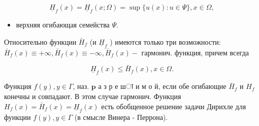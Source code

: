 \documentclass[10pt]{article}
\begin{document}
\[

\underline{H}_{f}(x)=\underline{H}_{f}(x ; \Omega)=\sup \{u(x): u \in \Psi\}, x \in \Omega,

\]



\begin{itemize}

  \item верхняя огибающая семейства $\Psi$.

\end{itemize}



Относительно функции $\bar{H}_{f}$ (и $\underline{H}_{f}$ ) имеются только три возможности: $\bar{H}_{f}(x) \equiv+\infty, \bar{H}_{f}(x) \equiv-\infty, \bar{H}_{f}(x)-$ гармонич. функция, причем всегда



\[

\underline{H}_{f}(x) \leqslant \bar{H}_{f}(x), x \in \Omega .

\]



Функция $f(y), y \in \Gamma$, наз. $\mathbf{p}$ а з р е шा и м о й, если обе огибающие $\bar{H}_{f}$ и $H_{f}$ конечны и совпадают. В этом случае гармонич. Функция $H_{f}(x)=\bar{H}_{f}(x)=\underline{H}_{f}(x)$ есть обобщенное решение задачи Дирихле для функции $f(y), y \in \Gamma$ (в смысле Винера - Перрона).
\end{document}
